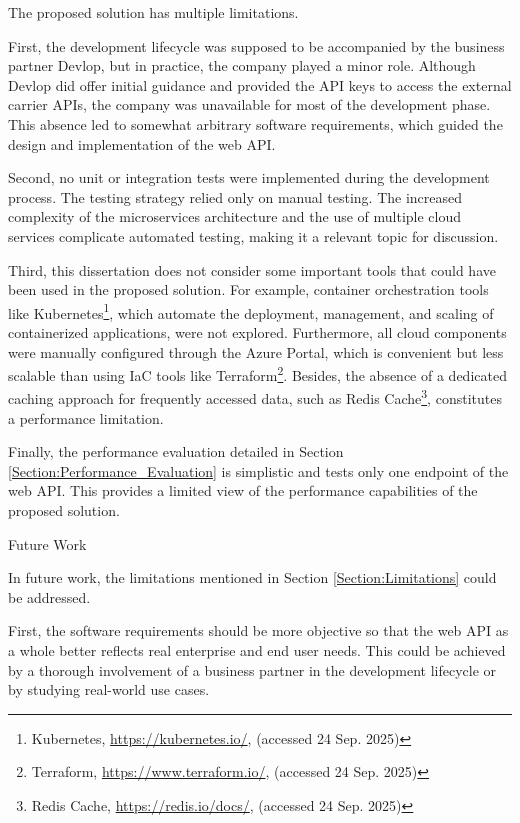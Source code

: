\documentclass[12pt, reqno]{amsbook}
\makeatletter
\def\section{\@startsection{section}{1}%
      \z@{.5\linespacing\@plus.7\linespacing}{.25\linespacing}%
      {\normalfont\bfseries\flushleft}}
\theoremstyle{definition}
\theoremstyle{definition}
\numberwithin{section}{chapter}
\numberwithin{table}{chapter}
\numberwithin{figure}{chapter}
\makeatother
\begin{document}
The proposed solution has multiple limitations.

First, the development lifecycle was supposed to be accompanied by the business partner Devlop, but in practice, the company played a minor role. Although Devlop did offer initial guidance and provided the \ac{API} keys to access the external carrier \acp{API}, the company was unavailable for most of the development phase. This absence led to somewhat arbitrary software requirements, which guided the design and implementation of the web \ac{API}.

Second, no unit or integration tests were implemented during the development process. The testing strategy relied only on manual testing. The increased complexity of the microservices architecture and the use of multiple cloud services complicate automated testing, making it a relevant topic for discussion.

Third, this dissertation does not consider some important tools that could have been used in the proposed solution. For example, container orchestration tools like Kubernetes\footnote{Kubernetes, \url{https://kubernetes.io/}, (accessed 24 Sep. 2025)}, which automate the deployment, management, and scaling of containerized applications, were not explored. Furthermore, all cloud components were manually configured through the Azure Portal, which is convenient but less scalable than using \ac{IaC} tools like Terraform\footnote{Terraform, \url{https://www.terraform.io/}, (accessed 24 Sep. 2025)}. Besides, the absence of a dedicated caching approach for frequently accessed data, such as Redis Cache\footnote{Redis Cache, \url{https://redis.io/docs/}, (accessed 24 Sep. 2025)}, constitutes a performance limitation.

Finally, the performance evaluation detailed in Section \ref{Section:Performance_Evaluation} is simplistic and tests only one endpoint of the web \ac{API}. This provides a limited view of the performance capabilities of the proposed solution.

\section{Future Work}
\label{Section:Future_Work}

In future work, the limitations mentioned in Section \ref{Section:Limitations} could be addressed.

First, the software requirements should be more objective so that the web \ac{API} as a whole better reflects real enterprise and end user needs. This could be achieved by a thorough involvement of a business partner in the development lifecycle or by studying real-world use cases.
\end{document}

